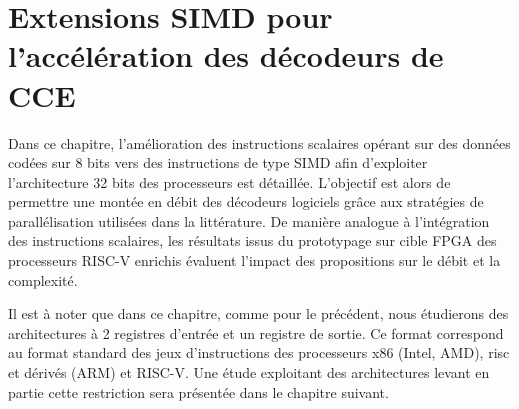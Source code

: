 \documentclass[../main.tex]{subfiles}
\begin{document}
%
%
%
%
%
\chapter{Extensions SIMD pour l'accélération des décodeurs de CCE} 
\label{chapter:3_2}

Dans ce chapitre, l'amélioration des instructions scalaires opérant sur des données codées sur 8 bits vers des instructions de type SIMD afin d'exploiter l'architecture 32 bits des processeurs est détaillée. 
L'objectif est alors de permettre une montée en débit des décodeurs logiciels grâce aux stratégies de parallélisation utilisées dans la littérature.
De manière analogue à l'intégration des instructions scalaires, les résultats issus du prototypage sur cible FPGA des processeurs RISC-V enrichis évaluent l'impact des propositions sur le débit et la complexité.

Il est à noter que dans ce chapitre, comme pour le précédent, nous étudierons des architectures à 2 registres d'entrée et un registre de sortie. Ce format correspond au format standard des jeux d'instructions des processeurs x86 (Intel, AMD), \acrshort{risc} et dérivés (ARM) et RISC-V. Une étude exploitant des architectures levant en partie cette restriction sera présentée dans le chapitre suivant.

\etocsettocstyle{{\large \hspace{-1.5 em} \textbf{} \hfill}\vspace{-2.5 em}\\\par\noindent\rule{\linewidth}{1 pt}\vspace{-.2 em}}{\par\noindent\rule{\linewidth}{1 pt}\\}
\localtableofcontents
%
%
%
%
%
% 
% 
\end{document}

